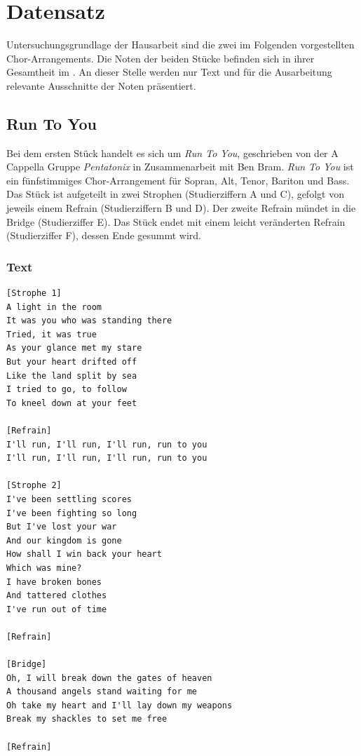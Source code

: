 \chapter{Datensatz}
\label{chap:Datensatz}
\pagestyle{plain}

Untersuchungsgrundlage der Hausarbeit sind die zwei im Folgenden vorgestellten Chor-Arrangements. Die Noten der beiden Stücke befinden sich in ihrer Gesamtheit im . An dieser Stelle werden nur Text und für die Ausarbeitung relevante Ausschnitte der Noten präsentiert.

\section{Run To You}

Bei dem ersten Stück handelt es sich um \textit{Run To You}, geschrieben von der A Cappella Gruppe \textit{Pentatonix} in Zusammenarbeit mit Ben Bram. \textit{Run To You} ist ein fünfstimmiges Chor-Arrangement für Sopran, Alt, Tenor, Bariton und Bass. Das Stück ist aufgeteilt in zwei Strophen (Studierziffern A und C), gefolgt von jeweils einem Refrain (Studierziffern B und D). Der zweite Refrain mündet in die Bridge (Studierziffer E). Das Stück endet mit einem leicht veränderten Refrain (Studierziffer F), dessen Ende gesummt wird.

\subsection*{Text}

\begin{verbatim}
[Strophe 1]
A light in the room
It was you who was standing there
Tried, it was true
As your glance met my stare
But your heart drifted off
Like the land split by sea
I tried to go, to follow
To kneel down at your feet

[Refrain]
I'll run, I'll run, I'll run, run to you
I'll run, I'll run, I'll run, run to you

[Strophe 2]
I've been settling scores
I've been fighting so long
But I've lost your war
And our kingdom is gone
How shall I win back your heart
Which was mine?
I have broken bones
And tattered clothes
I've run out of time

[Refrain]

[Bridge]
Oh, I will break down the gates of heaven
A thousand angels stand waiting for me
Oh take my heart and I'll lay down my weapons
Break my shackles to set me free

[Refrain]
\end{verbatim}

